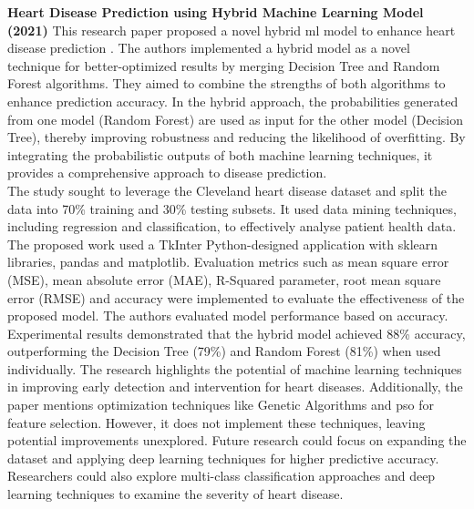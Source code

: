 \noindent
\textbf{Heart Disease Prediction using Hybrid Machine Learning Model (2021)}
This research paper proposed a novel hybrid \gls{ml} model to enhance heart disease prediction \citep{kavitha2021heart}. The authors implemented a hybrid model as a novel technique for better-optimized results by merging Decision Tree and Random Forest algorithms. They aimed to combine the strengths of both algorithms to enhance prediction accuracy. In the hybrid approach, the probabilities generated from one model (Random Forest) are used as input for the other model (Decision Tree), thereby improving robustness and reducing the likelihood of overfitting. By integrating the probabilistic outputs of both machine learning techniques, it provides a comprehensive approach to disease prediction. \\The study sought to leverage the Cleveland heart disease dataset and split the data into 70\% training and 30\% testing subsets. It used data mining techniques, including regression and classification, to effectively analyse patient health data. The proposed work used a TkInter Python-designed application with sklearn libraries, pandas and matplotlib. Evaluation metrics such as mean square error (MSE), mean absolute error (MAE), R-Squared parameter, root mean square error (RMSE) and accuracy were implemented to evaluate the effectiveness of the proposed model. The authors evaluated model performance based on accuracy. Experimental results demonstrated that the hybrid model achieved 88\% accuracy, outperforming the Decision Tree (79\%) and Random Forest (81\%) when used individually.  The research highlights the potential of machine learning techniques in improving early detection and intervention for heart diseases. Additionally, the paper mentions optimization techniques like Genetic Algorithms and \gls{pso} for feature selection. However, it does not implement these techniques, leaving potential improvements unexplored. Future research could focus on expanding the dataset and applying deep learning techniques for higher predictive accuracy. Researchers could also explore multi-class classification approaches and deep learning techniques to examine the severity of heart disease. 
\vspace{0.5 cm}

